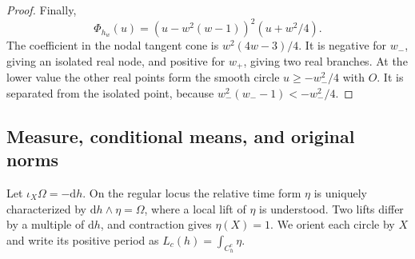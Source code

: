 \begin{proof}
Finally,
\[
 \Phi_{h_w}(u)=(u-w^2(w-1))^2(u+w^2/4).
\]
The coefficient in the nodal tangent cone is $w^2(4w-3)/4$.
It is negative for $w_-$, giving an isolated real node, and positive
for $w_+$, giving two real branches. At the lower value the other
real points form the smooth circle $u\ge-w_-^2/4$ with $O$.
It is separated from the isolated point, because
$w_-^2(w_--1)<-w_-^2/4$.
\end{proof}

\subsection{Measure, conditional means, and original norms}

Let $\iota_X\Omega=-\mathrm dh$. On the regular locus the relative
time form $\eta$ is uniquely characterized by
$\mathrm dh\wedge\eta=\Omega$, where a local lift of $\eta$ is
understood. Two lifts differ by a multiple of $\mathrm dh$, and
contraction gives $\eta(X)=1$. We orient each circle by $X$ and
write its positive period as $L_c(h)=\int_{C_h^c}\eta$.

